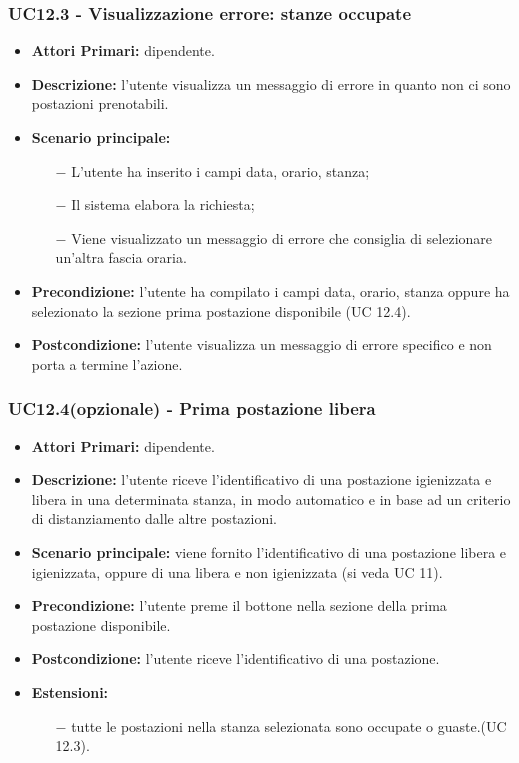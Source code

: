 \subsubsection{ UC12.3 - Visualizzazione errore: stanze occupate }
\begin{itemize}
	\item\textbf{Attori Primari:} dipendente.
	\item\textbf{Descrizione:} l’utente visualizza un messaggio di errore in quanto non ci sono postazioni prenotabili.
	\item\textbf{Scenario principale:} 
	\begin{itemize}
		\item[$-$] L’utente ha inserito i campi data, orario, stanza;
		\item[$-$] Il sistema elabora la richiesta;
		\item[$-$] Viene visualizzato un messaggio di errore che consiglia di selezionare un'altra fascia oraria.
	\end{itemize}
	\item\textbf{Precondizione:} l’utente ha compilato i campi data, orario, stanza oppure ha selezionato la sezione prima postazione 
	disponibile (UC 12.4).
	\item\textbf{Postcondizione:} l’utente visualizza un messaggio di errore specifico e non porta a termine l’azione.
\end{itemize}
\subsubsection{ UC12.4(opzionale) - Prima postazione libera }
\begin{itemize}
	\item\textbf{Attori Primari:} dipendente.
	\item\textbf{Descrizione:} l’utente riceve l'identificativo di una postazione igienizzata e libera in una determinata stanza, 
	in modo automatico e in base ad un criterio di distanziamento dalle altre postazioni.
	\item\textbf{Scenario principale:} viene fornito l'identificativo di una postazione libera e igienizzata, oppure di una libera e non igienizzata (si veda UC 11).
	\item\textbf{Precondizione:} l’utente preme il bottone nella sezione della prima postazione disponibile.
	\item\textbf{Postcondizione:} l’utente riceve l'identificativo di una postazione.
	\item\textbf{Estensioni:}
	\begin{itemize}
		\item[$-$] tutte le postazioni nella stanza selezionata sono occupate o guaste.(UC 12.3).
	\end{itemize}
\end{itemize}
